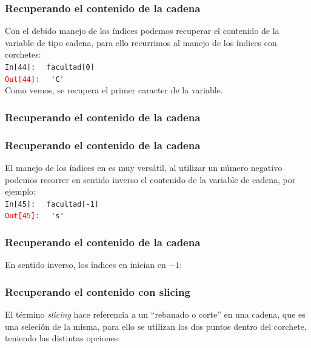 \documentclass[12pt]{beamer}
\begin{document}
{\begin{frame}
\end{frame}
\begin{frame}[fragile]
\frametitle{Recuperando el contenido de la cadena}
Con el debido manejo de los índices podemos recuperar el contenido de la variable de tipo cadena, para ello recurrimos al manejo de los índices con corchetes:
\\
\bigskip
\pause
\textcolor{ao}{\texttt{In[44]: }} \verb| facultad[0]|
\\
\pause
\textcolor{red}{\texttt{Out[44]: }} \verb| 'C'|
\\
\medskip
Como vemos, se recupera el primer caracter de la variable.
\end{frame}
\begin{frame}[fragile]
\frametitle{Recuperando el contenido de la cadena}
\begin{figure}
	 
\end{figure}
\end{frame}
\begin{frame}[fragile]
\frametitle{Recuperando el contenido de la cadena}
El manejo de los índices en \python{} es muy versátil, al utilizar un número negativo podemos recorrer en sentido inverso el contenido de la variable de cadena, por ejemplo:
\\
\bigskip
\pause
\textcolor{ao}{\texttt{In[45]: }} \verb| facultad[-1]|
\\
\pause
\textcolor{red}{\texttt{Out[45]: }} \verb| 's'|
\end{frame}
\begin{frame}[fragile]
\frametitle{Recuperando el contenido de la cadena}
En sentido inverso, los índices en \python{} inician en $-1$:
\begin{figure}
		
\end{figure}
\end{frame}
\begin{frame}[fragile]
\frametitle{Recuperando el contenido con slicing}
El término \emph{slicing} hace referencia a un \enquote{rebanado o corte} en una cadena, que es una seleción de la misma, para ello se utilizan los dos puntos dentro del corchete, teniendo las distintas opciones:
\end{frame}
\begin{frame}[fragile]

\end{frame}}
\end{document}
